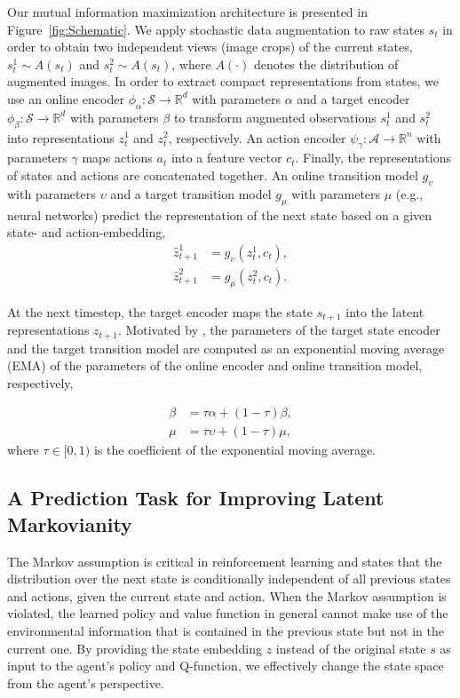 \documentclass[a4paper,12pt]{article}
\begin{document}
Our mutual information maximization architecture is presented in Figure~\ref{fig:Schematic}. 
We apply stochastic data augmentation to raw states $s_t$ in order to obtain two independent views (image crops) of the current states, $s_t^1 \sim A(s_t)$ and $s_t^2 \sim A(s_t)$, where $A(\cdot)$ denotes the distribution of augmented images. In order to extract compact representations from states, we use an online encoder $\phi_\alpha : \mathcal{S} \rightarrow \mathbb{R}^d$ with parameters $\alpha$ and a target encoder  $\phi_\beta : \mathcal{S} \rightarrow \mathbb{R}^d$  with parameters $\beta$ to transform augmented observations $s_t^1$ and $s_t^2$ into representations $z_t^1$ and $z_t^2$, respectively. An action encoder $\psi_\gamma : \mathcal{A} \rightarrow \mathbb{R}^n$ with parameters $\gamma$ maps actions $a_t$ into a feature vector $c_t$. Finally, the representations of states and actions are concatenated together. An online transition model $g_\upsilon$ with parameters $\upsilon$ and a target transition model $g_\mu$ with parameters $\mu$ (e.g., neural networks) predict the representation of the next state based on a given state- and action-embedding,
\begin{align}
    \hat{z}_{t+1}^1 &= g_\upsilon(z_t^1, c_t),\\
    \hat{z}_{t+1}^2 &= g_\mu(z_t^2, c_t).
\end{align}

At the next timestep, the target encoder maps the state $s_{t+1}$ into the latent representations $z_{t+1}$. Motivated by \citet{he2020momentum}, the parameters of the target state encoder and the target transition model are computed as an exponential moving average (EMA) of the parameters of the online encoder and online transition model, respectively,

\begin{align}
    \beta &= \tau\alpha + (1-\tau)\beta, \\
    \mu &= \tau\upsilon + (1-\tau)\mu,
\end{align}
where $\tau \in [0,1)$ is the coefficient of the exponential moving average. 


\subsection{A Prediction Task for Improving Latent Markovianity}
\label{sec:lpred}
The Markov assumption is critical in reinforcement learning and states that the distribution over the next state is conditionally independent of all previous states and actions, given the current state and action. When the Markov assumption is violated, the learned policy and value function in general cannot make use of the environmental information that is contained in the previous state but not in the current one. By providing the state embedding $z$ instead of the original state $s$ as input to the agent's policy and Q-function, we effectively change the state space from the agent's perspective.
\end{document}

